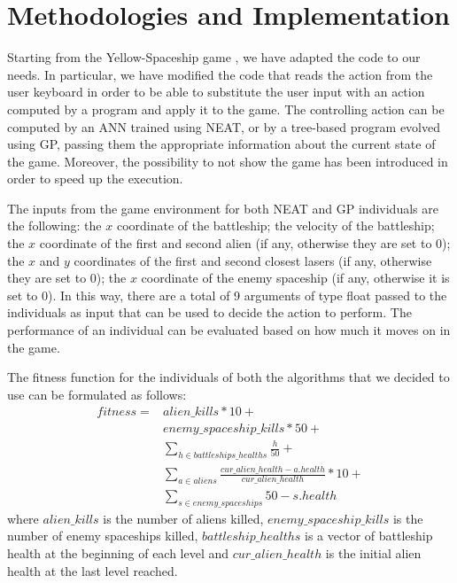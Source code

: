 \section{Methodologies and Implementation}
Starting from the Yellow-Spaceship game \cite{Yellow-Spaceship}, we have adapted the code to our needs.
In particular, we have modified the code that reads the action from the user keyboard in order to be
able to substitute the user input with an action computed by a program and apply it to the game.
The controlling action can be computed by an ANN trained using NEAT, or by a tree-based program evolved 
using GP, passing them the appropriate information about the current state of the game.
Moreover, the possibility to not show the game has been introduced in order to speed up the execution.

The inputs from the game environment for both NEAT and GP individuals are the following:
the $x$ coordinate of the battleship; the velocity of the battleship;
the $x$ coordinate of the first and second alien (if any, otherwise they are set to 0);
the $x$ and $y$ coordinates of the first and second closest lasers (if any, otherwise they are set to 0);
the $x$ coordinate of the enemy spaceship (if any, otherwise it is set to 0).
In this way, there are a total of 9 arguments of type float passed to the individuals as input that
can be used to decide the action to perform. 
The performance of an individual can be evaluated based on how much it moves on in the game.

The fitness function for the individuals of both the algorithms that we decided to use can be
formulated as follows:
\begin{equation}
\begin{split}
    fitness = & alien\_kills * 10 + \\
              & enemy\_spaceship\_kills * 50 + \\
              & \sum_{h \in battleships\_healths}^{} \frac{h}{50} + \\
              & \sum_{a \in aliens}^{} \frac{cur\_alien\_health - a.health}{cur\_alien\_health} * 10 + \\
              & \sum_{s \in enemy\_spaceships}^{} 50 - s.health
\end{split}
\end{equation}
where $alien\_kills$ is the number of aliens killed, 
$enemy\_spaceship\_kills$ is the number of enemy spaceships killed,
$battleship\_healths$ is a vector of battleship health at the beginning of each level and
$cur\_alien\_health$ is the initial alien health at the last level reached. 

